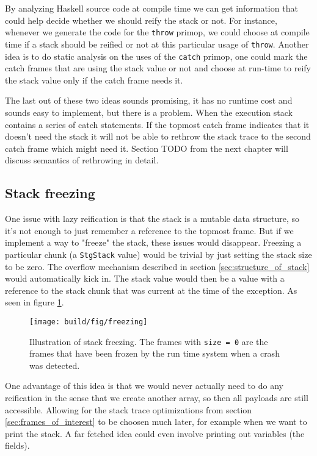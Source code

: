 By analyzing Haskell source code at compile time we can get
information that could help decide whether we should reify the stack or
not. For instance, whenever we generate the code for the \texttt{throw}
primop, we could choose at compile time if a stack should be reified or
not at this particular usage of \texttt{throw}. Another idea is to do
static analysis on the uses of the \texttt{catch} primop, one could mark
the catch frames that are using the stack value or not and choose at
run-time to reify the stack value only if the catch frame needs it.

The last out of these two ideas sounds promising, it has no runtime cost
and sounds easy to implement, but there is a problem. When the execution
stack contains a series of catch statements. If the topmost catch frame
indicates that it doesn't need the stack it will not be able to rethrow
the stack trace to the second catch frame which might need it. Section
TODO from the next chapter will discuss semantics of rethrowing in
detail.

\subsection{Stack freezing}

One issue with lazy reification is that the stack is a mutable data
structure, so it's not enough to just remember a reference to the
topmost frame. But if we implement a way to "freeze" the stack, these
issues would disappear. Freezing a particular chunk (a \texttt{StgStack}
value) would be trivial by just setting the stack size to be zero. The
overflow mechanism described in section \ref{sec:structure_of_stack}
would automatically kick in. The stack value would then be a value with
a reference to the stack chunk that was current at the time of the
exception. As seen in figure \ref{fig:freezing}.

\begin{figure}
\begin{mdframed}
  \texttt{[image: build/fig/freezing]}
  \caption{Illustration of stack freezing. The frames with \texttt{size = 0}
    are the frames that have been frozen by the run time system when a crash
    was detected.}
  \label{fig:freezing}
\end{mdframed}
\end{figure}

One advantage of this idea is that we would never actually need to
do any reification in the sense that we create another array, so
then all payloads are still accessible. Allowing for the stack trace
optimizations from section \ref{sec:frames_of_interest} to be choosen much later, for example
when we want to print the stack. A far fetched idea could even involve
printing out variables (the fields).

